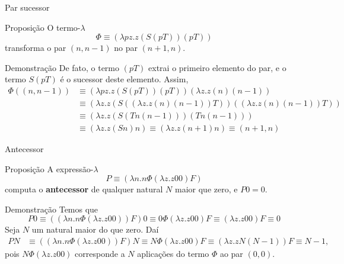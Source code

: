 \begin{frame}[fragile]{Par sucessor}

    \begin{block}{Proposição}
    O termo-$\lambda$
    \[
        \Phi \equiv (\lambda pz.z(S(pT))(pT))
    \]
    transforma o par $(n, n - 1)$ no par $(n + 1, n)$.
    \end{block}

    \begin{block}{Demonstração}
    De fato, o termo $(pT)$ extrai o primeiro elemento do par, e o termo $S(pT)$ é o sucessor
    deste elemento. Assim,
    \begin{align*}
        \Phi ((n, n - 1)) &\equiv  (\lambda pz.z(S(pT))(pT))(\lambda z.z(n)(n-1)) \\
        &\equiv  (\lambda z.z(S((\lambda z.z(n)(n-1))T))((\lambda z.z(n)(n-1))T)) \\
        &\equiv  (\lambda z.z(S(Tn(n-1)))(Tn(n-1))) \\
        &\equiv  (\lambda z.z(Sn)n) \equiv  (\lambda z.z(n + 1)n) \equiv (n + 1, n)
    \end{align*}
    \end{block}

\end{frame}

\begin{frame}[fragile]{Antecessor}

    \begin{block}{Proposição}
    A expressão-$\lambda$
    \[
        P \equiv (\lambda n.n\Phi (\lambda z.z00)F)
    \]
    computa o \textbf{antecessor} de qualquer natural $N$ maior que zero, e $P0 = 0$.
    \end{block}

    \begin{block}{Demonstração}
    Temos que
    \[
        P0 \equiv ((\lambda n.n\Phi (\lambda z.z00))F)0 \equiv 0\Phi (\lambda z.z00) F
        \equiv (\lambda z.z00)F \equiv 0
    \]
    Seja $N$ um natural maior do que zero. Daí
    \begin{align*}
        PN &\equiv ((\lambda n.n\Phi (\lambda z.z00))F)N \equiv N\Phi (\lambda z.z00) F \equiv (\lambda z.zN(N - 1))F \equiv N - 1,
    \end{align*}
    pois $N\Phi (\lambda z.z00)$ corresponde a $N$ aplicações do termo $\Phi$ ao par $(0, 0)$.
    \end{block}
\end{frame}


